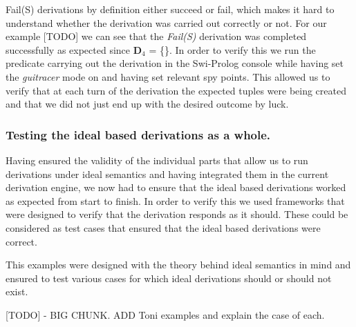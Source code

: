 Fail(S) derivations by definition either succeed or fail, which makes it hard to understand whether the derivation was carried out correctly or not. For our example [TODO] we can see that the \emph{Fail(S)} derivation was completed successfully as expected since  $\mathbf{D}_4$ = \{\}. In order to verify this we run the predicate carrying out the derivation in the Swi-Prolog console while having set the \emph{guitracer} mode on and having set relevant spy points. This allowed us to verify that at each turn of the derivation the expected tuples were being created and that we did not just end up with the desired outcome by luck.

\subsubsection{Testing the ideal based derivations as a whole.}
Having ensured the validity of the individual parts that allow us to run derivations under ideal semantics and having integrated them in the current derivation engine, we now had to ensure that the ideal based derivations worked as expected from start to finish. In order to verify this we used frameworks that were designed to verify that the derivation responds as it should. These could be considered as test cases that ensured that the ideal based derivations were correct.

This examples were designed with the theory behind ideal semantics in mind and ensured to test various cases for which ideal derivations should or should not exist.

[TODO] - BIG CHUNK. ADD Toni examples and explain the case of each.